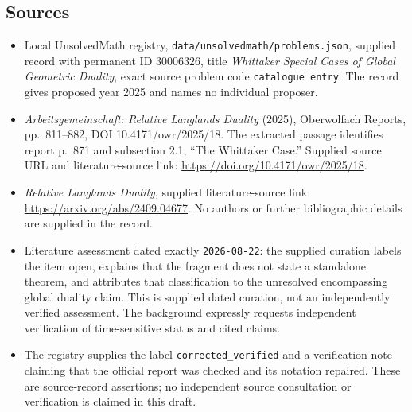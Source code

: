 \documentclass[11pt]{article}
\begin{document}
\subsection{Sources}
\begin{itemize}
\item Local UnsolvedMath registry, \texttt{data/unsolvedmath/problems.json}, supplied record with permanent ID \(30006326\), title \emph{Whittaker Special Cases of Global Geometric Duality}, exact source problem code \texttt{catalogue entry}. The record gives proposed year 2025 and names no individual proposer.
\item \emph{Arbeitsgemeinschaft: Relative Langlands Duality} (2025), Oberwolfach Reports, pp.\ 811--882, DOI 10.4171/owr/2025/18. The extracted passage identifies report p.\ 871 and subsection 2.1, ``The Whittaker Case.'' Supplied source URL and literature-source link: \url{https://doi.org/10.4171/owr/2025/18}.
\item \emph{Relative Langlands Duality}, supplied literature-source link: \url{https://arxiv.org/abs/2409.04677}. No authors or further bibliographic details are supplied in the record.
\item Literature assessment dated exactly \texttt{2026-08-22}: the supplied curation labels the item open, explains that the fragment does not state a standalone theorem, and attributes that classification to the unresolved encompassing global duality claim. This is supplied dated curation, not an independently verified assessment. The background expressly requests independent verification of time-sensitive status and cited claims.
\item The registry supplies the label \texttt{corrected\_verified} and a verification note claiming that the official report was checked and its notation repaired. These are source-record assertions; no independent source consultation or verification is claimed in this draft.
\end{itemize}
\end{document}
